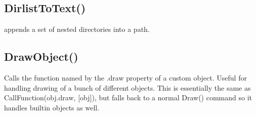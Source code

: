 \documentclass[letterpaper,10pt,english]{sphinxmanual}
\begin{document}
\subsection{DirlistToText()}
\label{\detokenize{reference/utility:dirlisttotext}}\label{\detokenize{reference/utility:index-4}}
\sphinxAtStartPar
{}

\sphinxAtStartPar
appends a set of nested directories into a path.

\sphinxAtStartPar
{}

\begin{sphinxVerbatim}[commandchars=\\\{\}]
\end{sphinxVerbatim}

\ignorespaces 

\subsection{DrawObject()}
\label{\detokenize{reference/utility:drawobject}}\label{\detokenize{reference/utility:index-5}}
\sphinxAtStartPar
{}

\sphinxAtStartPar
{}

\sphinxAtStartPar
Calls the function named by the  .draw property of a custom object.  Useful for handling drawing of a bunch of different objects. This is essentially the same as CallFunction(obj.draw, {[}obj{]}), but falls back to a normal Draw() command so it handles built\sphinxhyphen{}in objects as well.

\sphinxAtStartPar
{}

\begin{sphinxVerbatim}[commandchars=\\\{\}]
\end{sphinxVerbatim}

\sphinxAtStartPar
{}

\begin{sphinxVerbatim}[commandchars=\\\{\}]
\PYG{p}{[}\PYG{p}{]}\PYG{p}{[}\PYG{p}{]}
\end{sphinxVerbatim}
\end{document}
